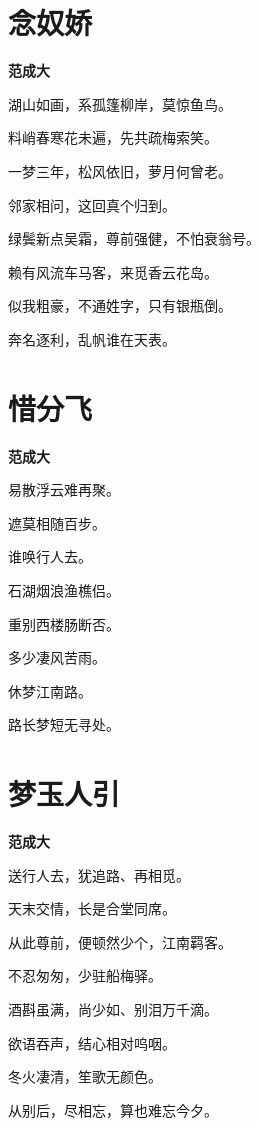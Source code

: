 \documentclass[12pt,a4paper]{ctexbook}
\begin{document}
\section{念奴娇}
\textbf{范成大}\par\vspace{0.5em}
湖山如画，系孤篷柳岸，莫惊鱼鸟。\par
料峭春寒花未遍，先共疏梅索笑。\par
一梦三年，松风依旧，萝月何曾老。\par
邻家相问，这回真个归到。\par
绿鬓新点吴霜，尊前强健，不怕衰翁号。\par
赖有风流车马客，来觅香云花岛。\par
似我粗豪，不通姓字，只有银瓶倒。\par
奔名逐利，乱帆谁在天表。\par

\section{惜分飞}
\textbf{范成大}\par\vspace{0.5em}
易散浮云难再聚。\par
遮莫相随百步。\par
谁唤行人去。\par
石湖烟浪渔樵侣。\par
重别西楼肠断否。\par
多少凄风苦雨。\par
休梦江南路。\par
路长梦短无寻处。\par

\section{梦玉人引}
\textbf{范成大}\par\vspace{0.5em}
送行人去，犹追路、再相觅。\par
天末交情，长是合堂同席。\par
从此尊前，便顿然少个，江南羁客。\par
不忍匆匆，少驻船梅驿。\par
酒斟虽满，尚少如、别泪万千滴。\par
欲语吞声，结心相对呜咽。\par
冬火凄清，笙歌无颜色。\par
从别后，尽相忘，算也难忘今夕。\par
\end{document}
